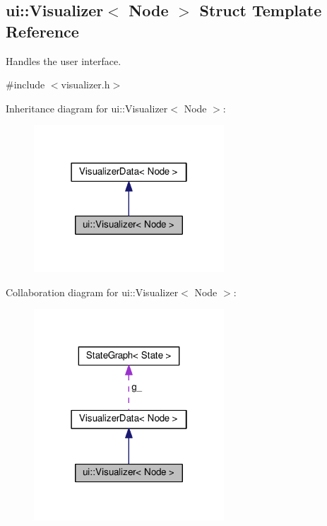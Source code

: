 \hypertarget{structui_1_1Visualizer}{}\subsection{ui\+:\+:Visualizer$<$ Node $>$ Struct Template Reference}
\label{structui_1_1Visualizer}


Handles the user interface.  




{\ttfamily \#include $<$visualizer.\+h$>$}



Inheritance diagram for ui\+:\+:Visualizer$<$ Node $>$\+:\nopagebreak
\begin{figure}[H]
\begin{center}
\leavevmode
\includegraphics[width=202pt]{structui_1_1Visualizer__inherit__graph}
\end{center}
\end{figure}


Collaboration diagram for ui\+:\+:Visualizer$<$ Node $>$\+:\nopagebreak
\begin{figure}[H]
\begin{center}
\leavevmode
\includegraphics[width=202pt]{structui_1_1Visualizer__coll__graph}
\end{center}
\end{figure}
